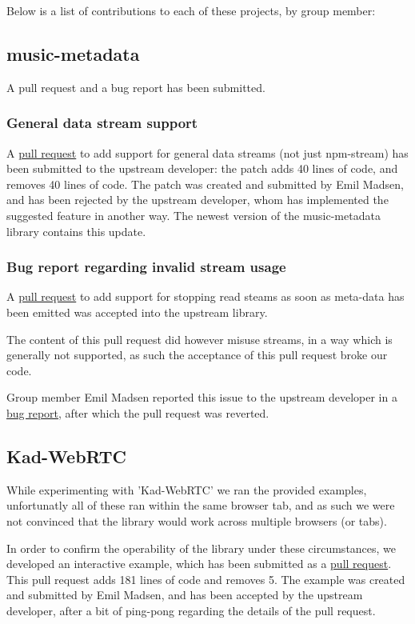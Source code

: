 Below is a list of contributions to each of these projects, by group member:
\subsection{music-metadata}
A pull request and a bug report has been submitted.

\subsubsection{General data stream support}
A \href{https://github.com/leetreveil/musicmetadata/pull/114}{pull request} to
add support for general data streams (not just npm-stream) has been submitted
to the upstream developer: the patch adds 40 lines of code, and removes 40
lines of code.
\newline\newline
The patch was created and submitted by Emil Madsen, and has been rejected by
the upstream developer, whom has implemented the suggested feature in another
way. The newest version of the music-metadata library contains this update.

\subsubsection{Bug report regarding invalid stream usage}
A \href{https://github.com/leetreveil/musicmetadata/pull/116}{pull request} to
add support for stopping read steams as soon as meta-data has been emitted was
accepted into the upstream library.

The content of this pull request did however misuse streams, in a way which is
generally not supported, as such the acceptance of this pull request broke our
code.

Group member Emil Madsen reported this issue to the upstream developer in a
\href{https://github.com/leetreveil/musicmetadata/issues/120}{bug report},
after which the pull request was reverted.

\subsection{Kad-WebRTC}
While experimenting with 'Kad-WebRTC' we ran the provided examples, 
unfortunatly all of these ran within the same browser tab, and as such we were
not convinced that the library would work across multiple browsers (or tabs).

In order to confirm the operability of the library under these circumstances,
we developed an interactive example, which has been submitted as a 
\href{https://github.com/kadtools/kad-webrtc/pull/11}{pull request}. This pull
request adds 181 lines of code and removes 5.
\newline\newline
The example was created and submitted by Emil Madsen, and has been accepted by
the upstream developer, after a bit of ping-pong regarding the details of the 
pull request.

